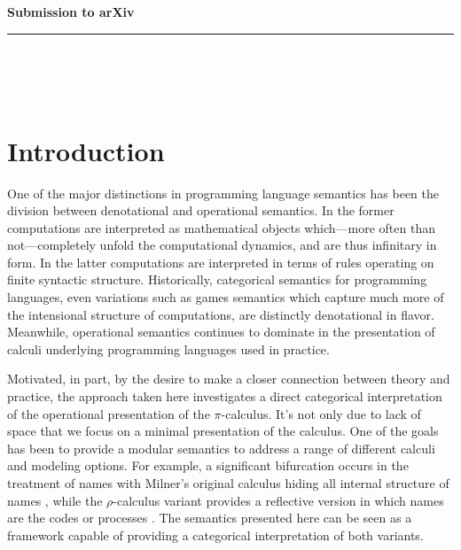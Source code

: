 \documentclass[]{acm_proc_article-sp}
\numberwithin{equation}{subsection}
\newcommand{\pic}{$\pi$-calculus}
\newcommand{\paperversion}{Draft Version 0.1 - Jan 7, 2015}
\newenvironment{toc}
{
\begin{list}{}{
   \setlength{\leftmargin}{0.4in}
   \setlength{\rightmargin}{0.6in}
   \setlength{\parskip}{0pt}
 } \item }
{\end{list}}
\begin{document}
\noindent
{\large \textbf{Submission to arXiv}}\\
\rule{6.25in}{0.75pt}\\\\\\

\maketitle




\section{Introduction}

One of the major distinctions in programming language semantics has
been the division between denotational and operational semantics. In
the former computations are interpreted as mathematical objects 
which---more often than not---completely unfold the computational
dynamics, and are thus infinitary in form. In the latter computations
are interpreted in terms of rules operating on finite syntactic
structure. Historically, categorical semantics for programming
languages, even variations such as games semantics which capture much
more of the intensional structure of computations, are distinctly
denotational in flavor. Meanwhile, operational semantics continues to
dominate in the presentation of calculi underlying programming
languages used in practice.

Motivated, in part, by the desire to make a closer connection between
theory and practice, the approach taken here investigates a direct
categorical interpretation of the operational presentation of the
{\pic}. It's not only due to lack of space that we focus on a minimal
presentation of the calculus. One of the goals has been to provide a
modular semantics to address a range of different calculi and modeling
options. For example, a significant bifurcation occurs in the
treatment of names with Milner's original calculus hiding all internal
structure of names \cite{milner91polyadicpi}, while the
$\rho$-calculus variant provides a reflective version in which names
are the codes or processes \cite{DBLP:journals/entcs/MeredithR05}. The
semantics presented here can be seen as a framework capable of
providing a categorical interpretation of both variants.
\end{document}
